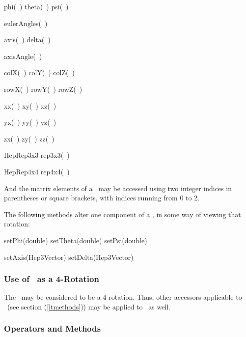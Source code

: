 \begin{shortlist}
  \item phi(~) \/\/\/ theta(~) \/\/\/ psi(~) 
		\see{\ref{eq:eulerrot},\ref{eq:phipsiconv},\ref{eq:thetaconv}}
  \item eulerAngles(~) 	
		\see{\ref{eq:eulerrot},\ref{eq:phipsiconv},\ref{eq:thetaconv}}
  \item axis(~)	\/\/\/ delta(~)
  \item axisAngle(~) 		\see{\ref{eq:axisrot},\ref{eq:deltaconv}}
  \item colX(~) \/\/\/ colY(~) \/\/\/ colZ(~) 
  \item rowX(~) \/\/\/ rowY(~) \/\/\/ rowZ(~) 
  \item xx(~) \/\/\/ xy(~) \/\/\/ xz(~) 
  \item yx(~) \/\/\/ yy(~) \/\/\/ yz(~) 
  \item zx(~) \/\/\/ zy(~) \/\/\/ zz(~) 

  \item HepRep3x3 rep3x3(~) 	

  \item HepRep4x4 rep4x4(~) 

\end{shortlist}

And the matrix elements of a \Ro\ may be accessed using two integer indices
in parentheses or square brackets, with indices running from 0 to 2.

The following methods alter one component of a \Ro, in some way of viewing 
that rotation:

\begin{shortlist}
  \item setPhi(double) \/\/\/ setTheta(double) \/\/\/ setPsi(double) 
		\see{\ref{eq:eulerrotR}}
  \item setAxis(Hep3Vector)	\/\/\/ setDelta(Hep3Vector)
		\see{\ref{eq:axisrotR}}
\end{shortlist}


\subsubsection{Use of \protect\Ro\ as a 4-Rotation}

The \Ro\ may be considered to be a 4-rotation.  Thus, other accessors 
applicable to \LT\ (see section (\ref{ltmethods}))
may be applied to \Ro\ as well.


\subsubsection{Operators and Methods}

